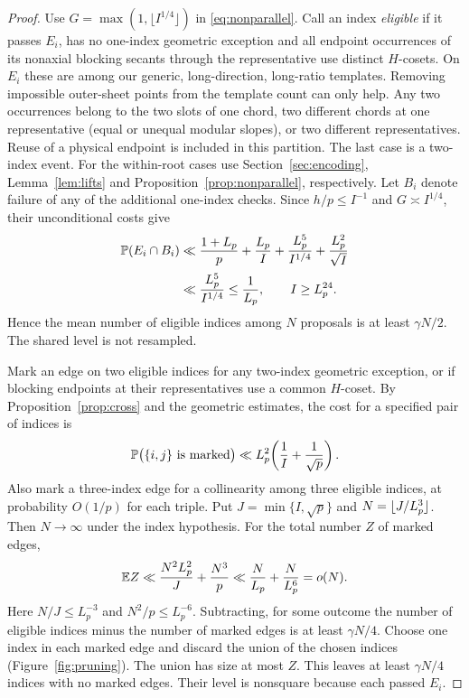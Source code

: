 \begin{proof} Use $G=\max(1,\lfloor I^{1/4}\rfloor)$ in \eqref{eq:nonparallel}. Call an index \emph{eligible} if it passes $E_i$, has no one-index geometric exception and all endpoint occurrences of its nonaxial blocking secants through the representative use distinct $H$-cosets. On $E_i$ these are among our generic, long-direction, long-ratio templates. Removing impossible outer-sheet points from the template count can only help. Any two occurrences belong to the two slots of one chord, two different chords at one representative (equal or unequal modular slopes), or two different representatives. Reuse of a physical endpoint is included in this partition. The last case is a two-index event. For the within-root cases use Section~\ref{sec:encoding}, Lemma~\ref{lem:lifts} and Proposition~\ref{prop:nonparallel}, respectively. Let $B_i$ denote failure of any of the additional one-index checks. Since $h/p\le I^{-1}$ and $G\asymp I^{1/4}$, their unconditional costs give
\begin{equation}\label{eq:one}
\mathcopy{Pr(E_i and B_i) << (1+L_p)/p + L_p/I + L_p^5/I^(1/4) + L_p^2/sqrt(I) << L_p^5/I^(1/4) <= 1/L_p for I >= L_p^24.}{\begin{aligned}
 \Prob(E_i\cap B_i)
 &\ll \frac{1+L_p}{p}+\frac{L_p}{I}
       +\frac{L_p^5}{I^{1/4}}+\frac{L_p^2}{\sqrt I}\\[2pt]
 &\ll \frac{L_p^5}{I^{1/4}}\le \frac{1}{L_p},
 \qquad I\ge L_p^{24}.
\end{aligned}}
\end{equation}
Hence the mean number of eligible indices among $N$ proposals is at least $\gamma N/2$. The shared level is not resampled.

Mark an edge on two eligible indices for any two-index geometric exception, or if blocking endpoints at their representatives use a common $H$-coset. By Proposition~\ref{prop:cross} and the geometric estimates, the cost for a specified pair of indices is
\begin{equation}\label{eq:two}
  \mathbb P\big(\{i,j\}\text{ is marked}\big)
    \ll L_p^2\!\left(\frac{1}{I}+\frac{1}{\sqrt p}\right).
\end{equation}
Also mark a three-index edge for a collinearity among three eligible indices, at probability $O(1/p)$ for each triple. Put $J=\min\{I,\sqrt p\}$ and $\mathcopy{N = floor(J / (L_p^3))}{N=\lfloor J/L_p^3\rfloor}$. Then $N\to\infty$ under the index hypothesis. For the total number $Z$ of marked edges,
\[
  \mathcopy{E[Z] << N^2 L_p^2/J + N^3/p << N/L_p + N/L_p^6 = o(N).}{\mathbb E Z
   \ll \frac{N^2 L_p^2}{J}+\frac{N^3}{p}
   \ll \frac{N}{L_p}+\frac{N}{L_p^6}=o(N).}
\]
Here $N/J\le L_p^{-3}$ and $N^2/p\le L_p^{-6}$. Subtracting, for some outcome the number of eligible indices minus the number of marked edges is at least $\gamma N/4$. Choose one index in each marked edge and discard the union of the chosen indices (Figure~\ref{fig:pruning}). The union has size at most $Z$. This leaves at least $\gamma N/4$ indices with no marked edges. Their level is nonsquare because each passed $E_i$.


\end{proof}
